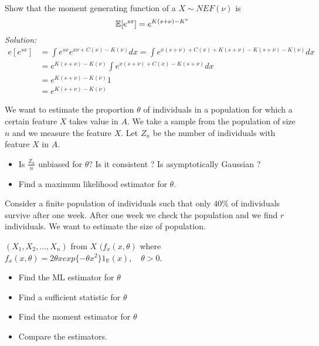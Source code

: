 \begin{ex}
	Show that the moment generating function of a \rv $X\sim NEF(\nu)$ is
	$$\mathbb{E}[e^{sx}]=e^{K(s+\nu)-K^\nu}$$
\textit{Solution:}
\[
\begin{split}
e[e^{sx}]
&=\int e^{sx}e^{x\nu+C(x)-K(\nu)}dx=\int e^{x(s+\nu)+C(x)+K(s+\nu)-K(s+\nu)-K(\nu)}dx\\
&=e^{K(s+\nu)-K(\nu)}\int e^{x(s+\nu)+C(x)-K(s+\nu)}dx\\
&=e^{K(s+\nu)-K(\nu)} 1\\
&=e^{K(s+\nu)-K(\nu)}
	\end{split}
	\]
\end{ex}



\begin{ex}
	We want to estimate the proportion $\theta$ of individuals in a population for which a certain feature $X$ takes value in $A$. We take a sample from the population of size $n$ and we measure the feature $X$. Let $Z_n$ be the number of individuals with feature $X$ in $A$. 
	\begin{itemize}
		\item
		Is $\frac{Z_n}{n}$ unbiased for $\theta$? Is it consistent ? Is asymptotically Gaussian ?
		\item
		Find a maximum likelihood estimator for $\theta$. 
	\end{itemize}
\end{ex}



\begin{ex}
	Consider a finite population of individuals such that only $40\%$ of individuals survive after one week. After one week we check the population and we find $r$ individuals. We want to estimate the size of population.
\end{ex}  

\begin{ex}
	$(X_1,X_2,\ldots,X_n)$ from $X$ $(f_x(x,\theta)$ where $f_x(x,\theta)=2\theta x exp\{ -\theta x^2\} 1_{\mathbb{R}}(x), \quad \theta > 0$.
	\begin{itemize}
		\item
		Find the ML estimator for $\theta$
		\item
		Find a sufficient statistic for $\theta$
		\item
		Find the moment estimator for $\theta$
		\item
		Compare the estimators.
	\end{itemize}
\end{ex}

